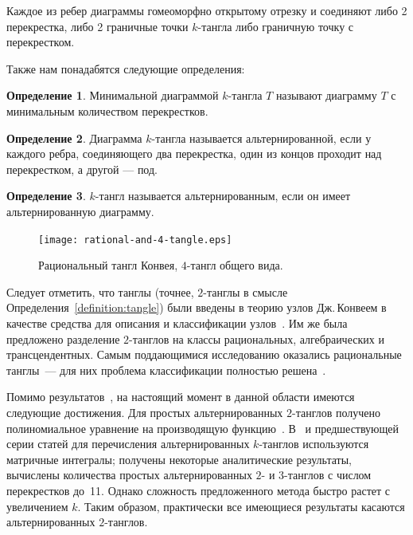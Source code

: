\documentclass[12pt]{article}
\theoremstyle{plain}
\theoremstyle{definition}
\newtheorem{definition}{Определение}
\begin{document}
		Каждое из ребер диаграммы гомеоморфно открытому отрезку и соединяют либо 2 перекрестка, либо 2 граничные точки $k$-тангла
		либо граничную точку с перекрестком.

		Также нам понадабятся следующие определения:

		\begin{definition}
			Минимальной диаграммой $k$-тангла $T$ называют диаграмму $T$ с минимальным количеством перекрестков.
		\end{definition}

		\begin{definition}
			Диаграмма $k$-тангла называется альтернированной, если у каждого ребра, соединяющего два перекрестка, один из
			концов проходит над перекрестком, а другой --- под.
		\end{definition}

		\begin{definition}
			$k$-тангл называется альтернированным, если он имеет альтернированную диаграмму.
		\end{definition}

		\begin{figure}[ht]
			\centering
			\texttt{[image: rational-and-4-tangle.eps]}
			\caption{\footnotesize Рациональный тангл Конвея, $4$-тангл общего вида.\label{figure:rational-and-4-tangle}}
		\end{figure}

		Следует отметить, что танглы (точнее, $2$-танглы в смысле Определения~\ref{definition:tangle}) были введены
		в теорию узлов Дж.\,Конвеем в качестве средства для описания и классификации узлов~\cite{Conway1970}.
		Им же была предложено разделение $2$-танглов на
		классы рациональных, алгебраических и трансцендентных. Самым поддающимися исследованию оказались
		рациональные танглы~--- для них проблема классификации полностью
		решена~\cite{KauffmanLambropoulou2004}.

		Помимо результатов~\cite{KauffmanLambropoulou2004}, на настоящий момент в данной области имеются
		следующие достижения. Для простых альтернированных $2$-танглов получено полиномиальное уравнение на
		производящую функцию~\cite{SundbergThistlethwaite1998}. В~\cite{JustinZuber2003} и предшествующей
		серии статей для перечисления альтернированных $k$-танглов используются матричные интегралы;
		получены некоторые аналитические результаты, вычислены количества простых альтернированных $2$-{} и
		$3$-танглов с числом перекрестков до~11. Однако сложность предложенного метода быстро растет с
		увеличением $k$. Таким образом, практически все имеющиеся результаты касаются альтернированных
		$2$-танглов.
\end{document}
